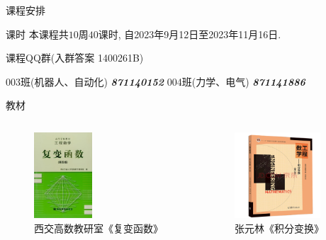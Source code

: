 \begin{frame}{课程安排}
	\onslide<+->
	\begin{block*}{课时}
		本课程共$10$周$40$课时, 自2023年9月12日至2023年11月16日.
	\end{block*}
	
	\onslide<+->
	\begin{block}{课程QQ群(入群答案 1400261B)}
		\begin{center}
			003班(机器人、自动化) \emph{\textbf{871140152}}
			\hspace{5mm}
			004班(力学、电气) \emph{\textbf{871141886}}
		\end{center}
	\end{block}

	\onslide<+->
	\begin{block}{教材}
		\vspace{-5mm}
		\begin{columns}
			\begin{figure}
				\includegraphics[height=32mm]{../image/book1.jpg}
				\caption{西交高数教研室《复变函数》}
			\end{figure}
			\begin{figure}
				\includegraphics[height=32mm]{../image/book2.png}
				\caption{张元林《积分变换》}
			\end{figure}
		\end{columns}
		\vspace{-4mm}
	\end{block}
\end{frame}


